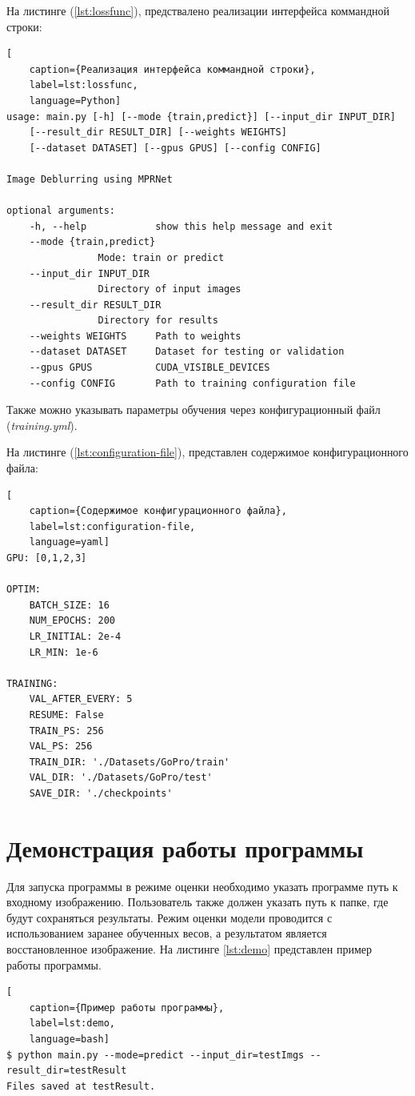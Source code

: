 На листинге (\ref{lst:lossfunc}), предствалено реализации интерфейса коммандной строки:
\begin{lstlisting}[
	caption={Реализация интерфейса коммандной строки},
	label=lst:lossfunc,
	language=Python]
usage: main.py [-h] [--mode {train,predict}] [--input_dir INPUT_DIR]
    [--result_dir RESULT_DIR] [--weights WEIGHTS]
    [--dataset DATASET] [--gpus GPUS] [--config CONFIG]

Image Deblurring using MPRNet

optional arguments:
    -h, --help            show this help message and exit
    --mode {train,predict}
                Mode: train or predict
    --input_dir INPUT_DIR
                Directory of input images
    --result_dir RESULT_DIR
                Directory for results
    --weights WEIGHTS     Path to weights
    --dataset DATASET     Dataset for testing or validation
    --gpus GPUS           CUDA_VISIBLE_DEVICES
    --config CONFIG       Path to training configuration file
\end{lstlisting}

Также можно указывать параметры обучения через конфигурационный файл (\textit{training.yml}).

На листинге (\ref{lst:configuration-file}), представлен содержимое конфигурационного файла:
\begin{lstlisting}[
    caption={Содержимое конфигурационного файла},
    label=lst:configuration-file,
    language=yaml]
GPU: [0,1,2,3]

OPTIM:
    BATCH_SIZE: 16
    NUM_EPOCHS: 200
    LR_INITIAL: 2e-4
    LR_MIN: 1e-6

TRAINING:
    VAL_AFTER_EVERY: 5
    RESUME: False
    TRAIN_PS: 256
    VAL_PS: 256
    TRAIN_DIR: './Datasets/GoPro/train'
    VAL_DIR: './Datasets/GoPro/test'
    SAVE_DIR: './checkpoints'
\end{lstlisting}

\section{Демонстрация работы программы}

Для запуска программы в режиме оценки необходимо указать программе путь к входному изображению. Пользователь также должен указать путь к папке, где будут сохраняться результаты. Режим оценки модели проводится с использованием заранее обученных весов, а результатом является восстановленное изображение. На листинге \ref{lst:demo} представлен пример работы программы.
\begin{lstlisting}[
    caption={Пример работы программы},
    label=lst:demo,
    language=bash]
$ python main.py --mode=predict --input_dir=testImgs --result_dir=testResult
Files saved at testResult.
\end{lstlisting}

